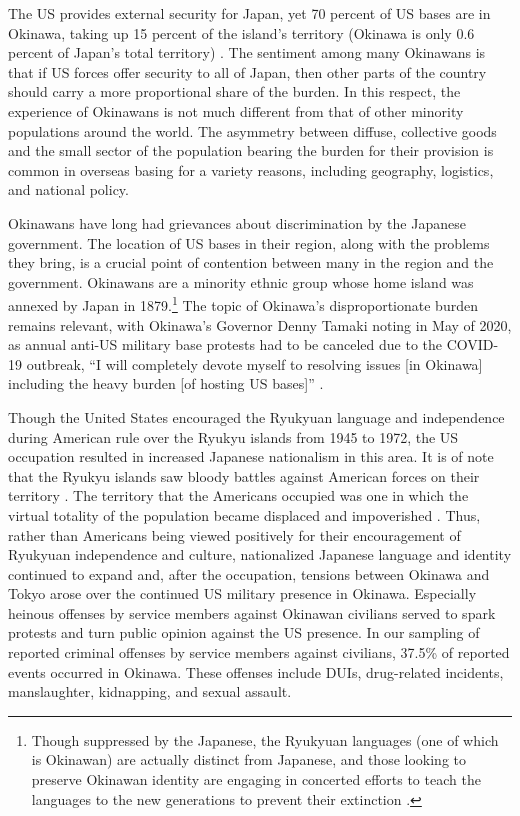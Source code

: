 The US provides external security for Japan, yet 70 percent of US bases are in Okinawa, taking up 15 percent of the island's territory (Okinawa is only 0.6 percent of Japan's total territory) \cite{JPTimes2020,tokyoone20200427}. The sentiment among many Okinawans is that if US forces offer security to all of Japan, then other parts of the country should carry a more proportional share of the burden. In this respect, the experience of Okinawans is not much different from that of other minority populations around the world. The asymmetry between diffuse, collective goods and the small sector of the population bearing the burden for their provision is common in overseas basing for a variety reasons, including geography, logistics, and national policy.

Okinawans have long had grievances about discrimination by the Japanese government. The location of US bases in their region, along with the problems they bring, is a crucial point of contention between many in the region and the government. Okinawans are a minority ethnic group whose home island was annexed by Japan in 1879.\footnote{Though suppressed by the Japanese, the Ryukyuan languages (one of which is Okinawan) are actually distinct from Japanese, and those looking to preserve Okinawan identity are engaging in concerted efforts to teach the languages to the new generations to prevent their extinction \cite{Heinrich2004,Fifield2014,UNESCO2010}.} The topic of Okinawa's disproportionate burden remains relevant, with Okinawa's Governor Denny Tamaki noting in May of 2020, as annual anti-US military base protests had to be canceled due to the COVID-19 outbreak, ``I will completely devote myself to resolving issues [in Okinawa] including the heavy burden [of hosting US bases]'' \cite{JPTimes2020}.

Though the United States encouraged the Ryukyuan language and independence during American rule over the Ryukyu islands from 1945 to 1972, the US occupation resulted in increased Japanese nationalism in this area. It is of note that the Ryukyu islands saw bloody battles against American forces on their territory \cite{tokyoone20200427}. The territory that the Americans occupied was one in which the virtual totality of the population became displaced and impoverished \cite{Heinrich2004}. Thus, rather than Americans being viewed positively for their encouragement of Ryukyuan independence and culture, nationalized Japanese language and identity continued to expand and, after the occupation, tensions between Okinawa and Tokyo arose over the continued US military presence in Okinawa. Especially heinous offenses by service members against Okinawan civilians served to spark protests and turn public opinion against the US presence. In our sampling of reported criminal offenses by service members against civilians, 37.5\% of reported events occurred in Okinawa. These offenses include DUIs, drug-related incidents, manslaughter, kidnapping, and sexual assault.

